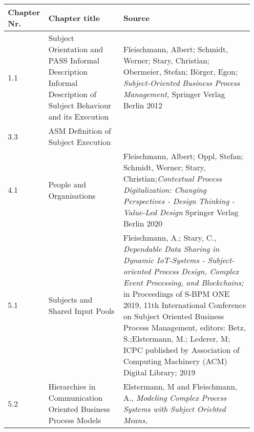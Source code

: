 



	\begin{longtable}[t]{ p{1 cm} p{4 cm} p{7 cm} }	
	\toprule
		\textbf{Chapter Nr.} & \textbf{Chapter title}  & \textbf{Source}
		\\
		\midrule
		1.1 \newline 2.1 \newline 3.1 & Subject Orientation and PASS \newline Informal Description \newline Informal Description of Subject Behaviour and its Execution & Fleischmann, Albert; Schmidt, Werner; Stary, Christian; Obermeier, Stefan; B\"orger, Egon; \newline \textit{Subject-Oriented Business Process Management,} \newline Springer Verlag Berlin 2012
		\\
		\midrule
		3.3 & ASM Definition of Subject Execution & 
		\\
		\midrule
		4.1 & People and Organisations & Fleischmann, Albert; Oppl, Stefan; Schmidt, Werner; Stary, Christian;\newline \textit{Contextual Process Digitalization: Changing Perspectives - Design Thinking - Value-Led Design} \newline Springer Verlag Berlin 2020
		\\
		\midrule
		5.1 & Subjects and Shared Input Pools & Fleischmann, A.; Stary, C.,\newline
			\textit{Dependable Data Sharing in Dynamic IoT-Systems - Subject-oriented Process Design, Complex Event Processing, and Blockchains;} \newline
			in Proceedings of S-BPM ONE 2019, 11th International Conference on Subject Oriented Business Process Management,\newline
			editors: Betz, S.;Elstermann, M.; Lederer, M; \newline
			ICPC published by Association of Computing Machinery (ACM) Digital Library; 2019
		\\
		\midrule
		5.2 & Hierarchies in Communication Oriented Business Process Models & Elstermann, M and Fleischmann, A.,\newline
		\textit{Modeling Complex Process Systems with Subject Oriebted Means,}\newline

\end{longtable}
